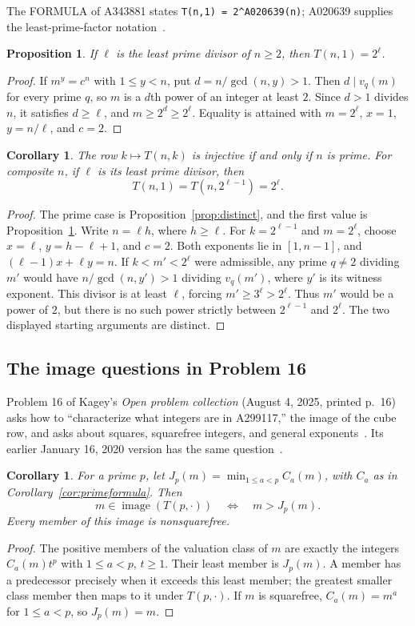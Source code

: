 \documentclass[11pt]{article}
\newtheorem{proposition}[theorem]{Proposition}
\newtheorem{corollary}[theorem]{Corollary}
\begin{document}
The FORMULA of A343881 states \texttt{T(n,1) = 2\^{}A020639(n)};
A020639 supplies
the least-prime-factor notation~\cite{a020639}.
\begin{proposition}\label{prop:firstcolumn}
If $\ell$ is the least prime divisor of $n\ge2$, then $T(n,1)=2^\ell$.
\end{proposition}
\begin{proof}
If $m^y=c^n$ with $1\le y<n$, put $d=n/\gcd(n,y)>1$.
Then $d\mid v_q(m)$ for every prime $q$, so $m$ is a $d$th power
of an integer at least $2$. Since $d>1$ divides $n$, it satisfies
$d\ge\ell$, and $m\ge2^d\ge2^\ell$.
Equality is attained with $m=2^\ell$, $x=1$, $y=n/\ell$, and $c=2$.
\end{proof}

\begin{corollary}\label{cor:composite}
The row $k\mapsto T(n,k)$ is injective if and only if $n$ is prime.
For composite $n$, if $\ell$ is its least prime divisor, then
\[
 T(n,1)=T(n,2^{\ell-1})=2^\ell.
\]
\end{corollary}
\begin{proof}
The prime case is Proposition~\ref{prop:distinct}, and the first value
is Proposition~\ref{prop:firstcolumn}. Write $n=\ell h$, where $h\ge\ell$.
For $k=2^{\ell-1}$ and $m=2^\ell$, choose
$x=\ell$, $y=h-\ell+1$, and $c=2$. Both exponents lie in $[1,n-1]$,
and $(\ell-1)x+\ell y=n$.
If $k<m'<2^\ell$ were admissible, any prime $q\ne2$ dividing $m'$
would have $n/\gcd(n,y')>1$ dividing $v_q(m')$, where $y'$ is its
witness exponent. This divisor is at least $\ell$, forcing
$m'\ge3^\ell>2^\ell$. Thus $m'$ would be a power of $2$, but there is
no such power strictly between $2^{\ell-1}$ and $2^\ell$.
The two displayed starting arguments are distinct.
\end{proof}

\subsection*{The image questions in Problem 16}
Problem 16 of Kagey's \emph{Open problem collection} (August 4, 2025,
printed p.~16) asks how to ``characterize what integers are in A299117,''
the image of the cube row, and asks about squares, squarefree integers,
and general exponents~\cite{problems}. Its earlier January 16, 2020
version has the same question~\cite{problems2020}.

\begin{corollary}\label{cor:image}
For a prime $p$, let $J_p(m)=\min_{1\le a<p}C_a(m)$, with $C_a$
as in Corollary~\ref{cor:primeformula}. Then
\[
 m\in\operatorname{image}(T(p,\cdot))\quad\Longleftrightarrow\quad
 m>J_p(m).
\]
Every member of this image is nonsquarefree.
\end{corollary}
\begin{proof}
The positive members of the valuation class of $m$ are exactly the
integers $C_a(m)t^p$ with $1\le a<p$, $t\ge1$.
Their least member is $J_p(m)$. A member has a predecessor precisely
when it exceeds this least member; the greatest smaller class member
then maps to it under $T(p,\cdot)$.
If $m$ is squarefree, $C_a(m)=m^a$ for $1\le a<p$, so $J_p(m)=m$.
\end{proof}
\end{document}
